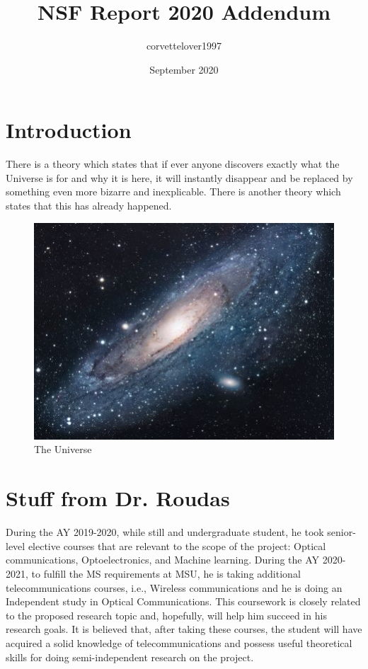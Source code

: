 \documentclass{article}
\title{NSF Report 2020 Addendum}
\author{corvettelover1997 }
\date{September 2020}
\begin{document}
\maketitle

\section{Introduction}
There is a theory which states that if ever anyone discovers exactly what the Universe is for and why it is here, it will instantly disappear and be replaced by something even more bizarre and inexplicable.
There is another theory which states that this has already happened.

\begin{figure}[h!]
\centering
\includegraphics[scale=1.7]{universe}
\caption{The Universe}
\label{fig:universe}
\end{figure}

\section{Stuff from Dr. Roudas}
During the AY 2019-2020, while still and undergraduate student, he took senior-level elective courses that are relevant to the scope of the project: Optical communications, Optoelectronics, and Machine learning. During the AY 2020-2021, to fulfill the MS requirements at MSU, he is taking additional telecommunications courses, i.e., Wireless communications and he is doing an Independent study in Optical Communications. This coursework is closely related to the proposed research topic and, hopefully, will help him succeed in his research goals. It is believed that, after taking these courses, the student will have acquired a solid knowledge of telecommunications and possess useful theoretical skills for doing semi-independent research on the project.
\end{document}
